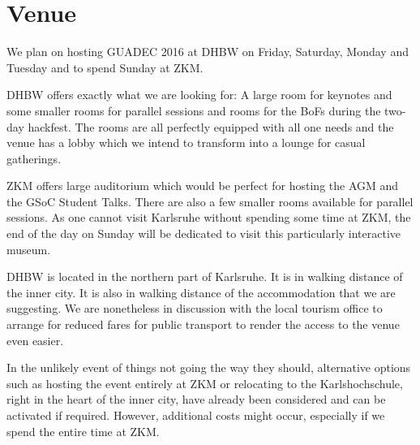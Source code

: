 
\section{Venue}


We plan on hosting GUADEC 2016 at DHBW on Friday, Saturday, Monday and Tuesday and to spend Sunday at ZKM.

DHBW offers exactly what we are looking for: A large room for keynotes and some smaller rooms for parallel sessions and rooms for the BoFs during the two-day hackfest. The rooms are all perfectly equipped with all one needs and the venue has a lobby which we intend to transform into a lounge for casual gatherings. 

ZKM offers large auditorium which would be perfect for hosting the AGM and the GSoC Student Talks. There are also a few smaller rooms available for parallel sessions. As one cannot visit Karlsruhe without spending some time at ZKM, the end of the day on Sunday will be dedicated to visit this particularly interactive museum.

DHBW is located in the northern part of Karlsruhe. It is in walking distance of the inner city. It is also in walking distance of the accommodation that we are suggesting. We are nonetheless in discussion with the local tourism office to arrange for reduced fares for public transport to render the access to the venue even easier. 

In the unlikely event of things not going the way they should, alternative options such as hosting the event entirely at ZKM or relocating to the Karlshochschule, right in the heart of the inner city, have already been considered and can be activated if required. However, additional costs might occur, especially if we spend the entire time at ZKM. 
